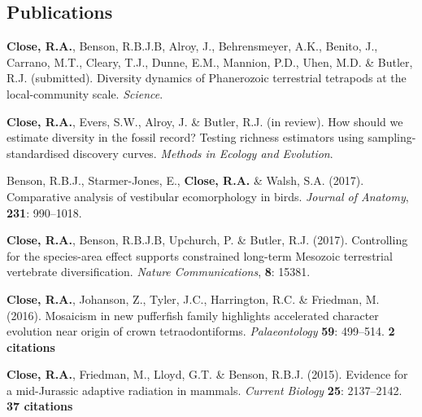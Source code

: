 \documentclass[a4paper, oneside, final]{scrartcl} %
\begin{document}
\begin{center}
\section{Publications}

\begin{flushleft}

\textbf{Close, R.A.}, Benson, R.B.J.B, Alroy, J., Behrensmeyer, A.K., Benito, J., Carrano, M.T., Cleary, T.J., Dunne, E.M., Mannion, P.D., Uhen, M.D. \& Butler, R.J. (submitted). Diversity dynamics of Phanerozoic terrestrial tetrapods at the local-community scale. \emph{Science}.
\vspace{6Pt}

\textbf{Close, R.A.}, Evers, S.W., Alroy, J. \& Butler, R.J. (in review). How should we estimate diversity in the fossil record? Testing richness estimators using sampling-standardised discovery curves. \emph{Methods in Ecology and Evolution}.
\vspace{6Pt}

Benson, R.B.J., Starmer-Jones, E., \textbf{Close, R.A.} \& Walsh, S.A. (2017). Comparative analysis of vestibular ecomorphology in birds. \emph{Journal of Anatomy}, \textbf{231}: 990--1018.
\vspace{6Pt}

\textbf{Close, R.A.}, Benson, R.B.J.B, Upchurch, P. \& Butler, R.J. (2017). Controlling for the species-area effect supports constrained long-term Mesozoic terrestrial vertebrate diversification. \emph{Nature Communications}, \textbf{8}: 15381. 
\vspace{6Pt}

\textbf{Close, R.A.}, Johanson, Z., Tyler, J.C., Harrington, R.C. \& Friedman, M. (2016). Mosaicism in new pufferfish family highlights accelerated character evolution near origin of crown tetraodontiforms. \emph{Palaeontology} \textbf{59}: 499--514. 
\textbf{2 citations}
\vspace{6pt}

\textbf{Close, R.A.}, Friedman, M., Lloyd, G.T. \& Benson, R.B.J. (2015). Evidence for a mid-Jurassic adaptive radiation in mammals. \emph{Current Biology} \textbf{25}: 2137--2142. 
\textbf{37 citations}
\vspace{6pt}


\end{flushleft}
\end{center}
\end{document}
